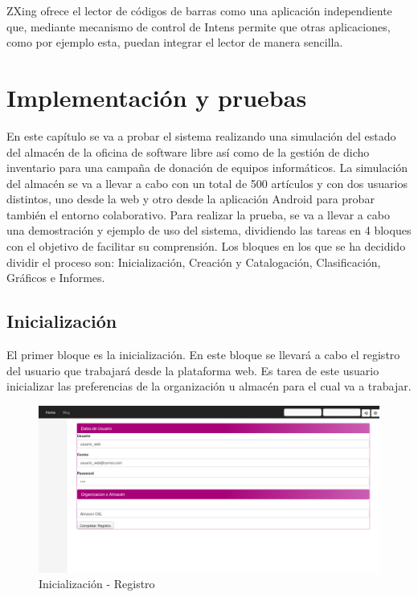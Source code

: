 \documentclass[a4paper,11pt]{book}
\begin{document}
ZXing ofrece el lector de códigos de barras como una aplicación independiente que, mediante mecanismo de control de Intens\cite{cebra2} permite que otras aplicaciones, como por ejemplo esta,  puedan integrar el lector de manera sencilla.




\chapter{Implementación y pruebas}

En este capítulo se va a probar el sistema realizando una simulación del estado del almacén de la oficina de software libre así como de la gestión de dicho inventario para una campaña de donación de equipos informáticos. La simulación del almacén se va a llevar a cabo con un total de 500 artículos y con dos usuarios distintos, uno desde la web y otro desde la aplicación Android para probar también el entorno colaborativo.   Para realizar la prueba, se va a llevar a cabo una demostración y ejemplo de uso del sistema, dividiendo las tareas en 4 bloques con el objetivo de facilitar su comprensión. Los bloques en los que se ha decidido dividir el proceso son: Inicialización, Creación y Catalogación, Clasificación, Gráficos e Informes. 

\section{Inicialización}
El primer bloque es la inicialización. En este bloque se llevará a cabo el registro del usuario que trabajará desde la plataforma web. Es tarea de este usuario inicializar las preferencias de la organización u almacén para el cual va a trabajar. 

\begin{figure}[H] 
\centering 
\includegraphics[scale=0.3]{imagenes/pruebas/registro.png}
\caption{ Inicialización - Registro\cite{propio}}
\end{figure}
\end{document}
